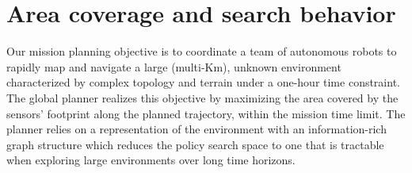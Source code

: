 \documentclass[letterpaper, 10pt, conference]{ieeeconf}      %
\newcommand{\ph}[1]{{\textbf{#1}:}} %
\newcommand{\todo}[1]{{\color{red} #1 }} %
\newcommand{\rev}[1]{{\color{blue}#1}} %
\begin{document}








\section{Area coverage and search behavior}
Our mission planning objective %
is to coordinate a team of autonomous robots to rapidly map and navigate a large (multi-Km), unknown environment characterized by complex topology and terrain under a one-hour time constraint. The global planner \rev{realizes} this objective by maximizing the area covered by the sensors' footprint along the planned trajectory, within the mission time limit. The planner relies on a representation of the environment with an information-rich graph structure which reduces the policy search space to one that is tractable when exploring large environments over long time horizons.
\end{document}
